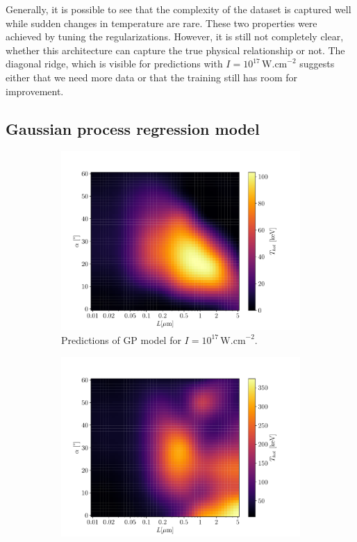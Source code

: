 Generally, it is possible to see that the complexity of the dataset is captured well while sudden changes in temperature are rare. These two properties were achieved by tuning the regularizations. However, it is still not completely clear, whether this architecture can capture the true physical relationship or not. The diagonal ridge, which is visible for predictions with $I = 10^{17} \, \mathrm{W.cm}^{-2}$ suggests either that we need more data or that the training still has room for improvement.


\subsection*{Gaussian process regression model}

\begin{figure}[ht]
	\centering
	\begin{subfigure}{0.49\textwidth}
		\centering
		\includegraphics[width=\textwidth]{figures/gp17_pred}
		\caption{Predictions of GP model for $I = 10^{17} \, \mathrm{W.cm}^{-2}$.}
		\label{fig:gp-pred-a}
	\end{subfigure}
	\hfill
	\begin{subfigure}{0.49\textwidth}
		\centering
		\includegraphics[width=\textwidth]{figures/gp18_pred}

\end{subfigure}
\end{figure}
